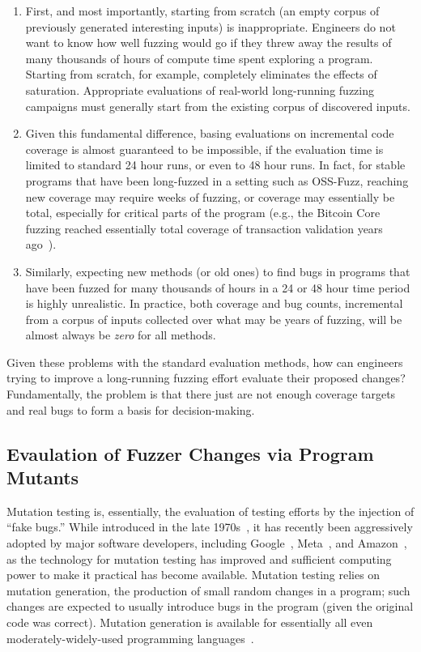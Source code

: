   \begin{enumerate}
  \item First, and most importantly, starting from scratch (an empty corpus of previously generated interesting inputs) is inappropriate.  Engineers do not want to know how well fuzzing would go if they threw away the results of many thousands of hours of compute time spent exploring a program.  Starting from scratch, for example, completely eliminates the effects of saturation.  Appropriate evaluations of real-world long-running fuzzing campaigns must generally start from the existing corpus of discovered inputs.
  \item Given this fundamental difference, basing evaluations on incremental code coverage is almost guaranteed to be impossible, if the evaluation time is limited to standard 24 hour runs, or even to 48 hour runs.  In fact, for stable programs that have been long-fuzzed in a setting such as OSS-Fuzz, reaching new coverage may require weeks of fuzzing, or coverage may essentially be total, especially for critical parts of the program (e.g., the Bitcoin Core fuzzing reached essentially total coverage of transaction validation years ago~\cite{Lacunae}).
  \item Similarly, expecting new methods (or old ones) to find bugs in programs that have been fuzzed for many thousands of hours in a 24 or 48 hour time period is highly unrealistic.  In practice, both coverage and bug counts, incremental from a corpus of inputs collected over what may be years of fuzzing, will be almost always be \emph{zero} for all methods.
\end{enumerate}

Given these problems with the standard evaluation methods, how can engineers trying to improve a long-running fuzzing effort evaluate their proposed changes?   Fundamentally, the problem is that there just are not enough coverage targets and real bugs to form a basis for decision-making.

\subsection{Evaulation of Fuzzer Changes via Program Mutants}

Mutation testing is, essentially, the evaluation of testing efforts by the injection of ``fake bugs.''  While introduced in the late 1970s~\cite{demillo1978hints,mathur2012foundations,demillo1978hints}, it has recently been aggressively adopted by major software developers, including Google~\cite{GoogleMut}, Meta~\cite{BellerFacebookMutation}, and
  Amazon~\cite{AmazonMut}, as the technology for mutation testing has improved and sufficient computing power to make it practical has become available.  Mutation testing relies on mutation generation, the production of small random changes in a program; such changes are expected to usually introduce bugs in the program (given the original code was correct).  Mutation generation is available for essentially all even moderately-widely-used programming languages~\cite{UMSyntax}.

